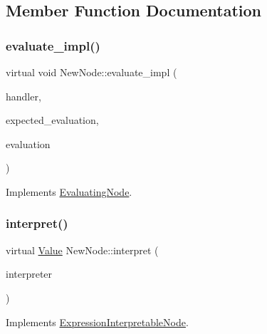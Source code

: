 \subsection{Member Function Documentation}
\mbox{\label{classNewNode_a53fe843af3bbb2add900646ef3891f8e}} 
\subsubsection{\texorpdfstring{evaluate\+\_\+impl()}{evaluate\_impl()}}
{\footnotesize\ttfamily virtual void New\+Node\+::evaluate\+\_\+impl (\begin{DoxyParamCaption}\item[{\hyperlink{classSystemHandler}{System\+Handler} $\ast$}]{handler,  }\item[{\hyperlink{statics_8h_a6664c451ca7787483a7981cc1de68dbb}{E\+V\+A\+L\+U\+A\+T\+I\+O\+N\+\_\+\+T\+Y\+PE}}]{expected\+\_\+evaluation,  }\item[{struct \hyperlink{structEvaluation}{Evaluation} $\ast$}]{evaluation }\end{DoxyParamCaption})\hspace{0.3cm}{\ttfamily [virtual]}}



Implements \hyperlink{classEvaluatingNode_a085fa06e0b46a93c814dc55cda0c1b26}{Evaluating\+Node}.

\mbox{\label{classNewNode_a77447b9402f0153401bf0e623b5f1e6e}} 
\subsubsection{\texorpdfstring{interpret()}{interpret()}}
{\footnotesize\ttfamily virtual \hyperlink{classValue}{Value} New\+Node\+::interpret (\begin{DoxyParamCaption}\item[{\hyperlink{classInterpreter}{Interpreter} $\ast$}]{interpreter }\end{DoxyParamCaption})\hspace{0.3cm}{\ttfamily [virtual]}}



Implements \hyperlink{classExpressionInterpretableNode_a43650f046c48fc539f77a207e3c9181e}{Expression\+Interpretable\+Node}.

